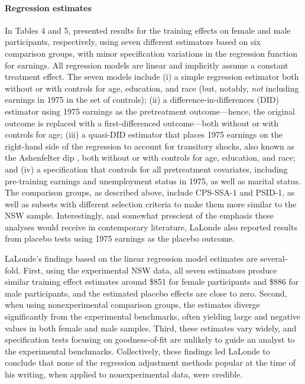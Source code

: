 \documentclass[letterpaper,12pt,leqno]{article}
\begin{document}
\paragraph{Regression estimates} In Tables 4 and 5, \citet{LaLonde} presented results for the training effects on female and male participants, respectively, using seven different estimators based on six comparison groups, with minor specification variations in the regression function for  earnings.
All regression models are linear and implicitly assume a constant treatment effect.  The seven models include (i) a simple regression estimator both without or with controls for age, education, and race (but, notably, {\it not} including earnings in 1975 in the set of controls); (ii) a difference-in-differences (DID) estimator using 1975 earnings as the pretreatment outcome---hence, the original outcome is replaced with a first-differenced outcome---both without or with controls for age; (iii) a quasi-DID estimator that places 1975 earnings on the right-hand side of the regression to account for transitory shocks, also known as the Ashenfelter dip \citep{ashenfelter1978estimating}, both without or with controls for age, education, and race; and (iv) a specification that controls for all pretreatment covariates, including pre-training earnings and unemployment status in 1975, as well as marital status. The comparison groups, as described above, include CPS-SSA-1 and PSID-1, as well as subsets with different selection criteria to make them more similar to the NSW sample. Interestingly, and somewhat prescient of the emphasis these analyses would receive in contemporary literature, LaLonde also reported results from placebo tests using 1975 earnings as the placebo outcome. 

LaLonde's findings based on the linear regression model estimates are several-fold. First, using the experimental NSW  data, all seven estimators produce similar training effect estimates around \$851 for female participants and \$886 for male participants, and the estimated placebo effects are close to zero. Second, when using nonexperimental comparison groups, the estimates diverge significantly from the experimental benchmarks, often yielding large and negative values in both female and male samples. Third, these estimates vary widely, and specification tests focusing on goodness-of-fit are unlikely to guide an analyst to the experimental benchmarks. Collectively, these findings led LaLonde to conclude that none of the regression adjustment methods popular at the time of his writing, when applied to nonexperimental data, were credible.
\end{document}
